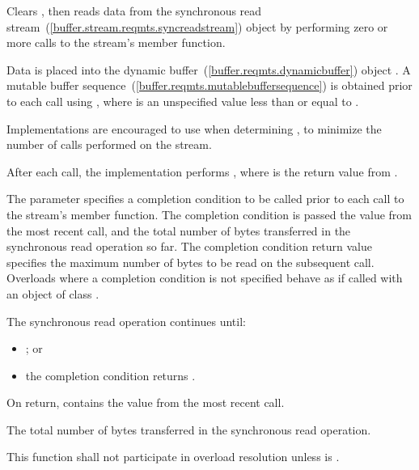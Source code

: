 \begin{itemdescr}
\pnum
\effects Clears , then reads data from the synchronous read stream~(\ref{buffer.stream.reqmts.syncreadstream}) object  by performing zero or more calls to the stream's  member function.

\pnum
Data is placed into the dynamic buffer~(\ref{buffer.reqmts.dynamicbuffer}) object . A mutable buffer sequence~(\ref{buffer.reqmts.mutablebuffersequence}) is obtained prior to each  call using , where  is an unspecified value less than or equal to . \begin{note} Implementations are encouraged to use  when determining , to minimize the number of  calls performed on the stream. \end{note} After each  call, the implementation performs , where  is the return value from .

\pnum
The  parameter specifies a completion condition to be called prior to each call to the stream's  member function. The completion condition is passed the  value from the most recent  call, and the total number of bytes transferred in the synchronous read operation so far. The completion condition return value specifies the maximum number of bytes to be read on the subsequent  call. Overloads where a completion condition is not specified behave as if called with an object of class .

\pnum
 The synchronous read operation continues until:

\begin{itemize}
\item {}; or
\item the completion condition returns .
\end{itemize}

\pnum
On return,  contains the  value from the most recent  call.

\pnum
\returns The total number of bytes transferred in the synchronous read operation.

\pnum
\remarks This function shall not participate in overload resolution unless  is .
\end{itemdescr}



